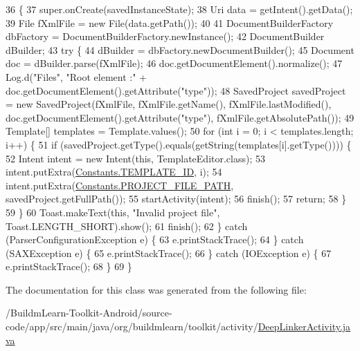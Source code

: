 \begin{DoxyCode}
36                                                        \{
37         super.onCreate(savedInstanceState);
38         Uri data = getIntent().getData();
39         File fXmlFile = \textcolor{keyword}{new} File(data.getPath());
40 
41         DocumentBuilderFactory dbFactory = DocumentBuilderFactory.newInstance();
42         DocumentBuilder dBuilder;
43         \textcolor{keywordflow}{try} \{
44             dBuilder = dbFactory.newDocumentBuilder();
45             Document doc = dBuilder.parse(fXmlFile);
46             doc.getDocumentElement().normalize();
47             Log.d(\textcolor{stringliteral}{"Files"}, \textcolor{stringliteral}{"Root element :"} + doc.getDocumentElement().getAttribute(\textcolor{stringliteral}{"type"}));
48             SavedProject savedProject = \textcolor{keyword}{new} SavedProject(fXmlFile, fXmlFile.getName(), 
      fXmlFile.lastModified(), doc.getDocumentElement().getAttribute(\textcolor{stringliteral}{"type"}), fXmlFile.getAbsolutePath());
49             Template[] templates = Template.values();
50             \textcolor{keywordflow}{for} (\textcolor{keywordtype}{int} i = 0; i < templates.length; i++) \{
51                 \textcolor{keywordflow}{if} (savedProject.getType().equals(getString(templates[i].getType()))) \{
52                     Intent intent = \textcolor{keyword}{new} Intent(\textcolor{keyword}{this}, TemplateEditor.class);
53                     intent.putExtra(\hyperlink{classorg_1_1buildmlearn_1_1toolkit_1_1constant_1_1Constants_a2ee9d59d6a353dc4664ed2e2086dae9d}{Constants.TEMPLATE\_ID}, i);
54                     intent.putExtra(\hyperlink{classorg_1_1buildmlearn_1_1toolkit_1_1constant_1_1Constants_ab2586e8aa144cd7e8b4928186d709ea8}{Constants.PROJECT\_FILE\_PATH}, 
      savedProject.getFullPath());
55                     startActivity(intent);
56                     finish();
57                     \textcolor{keywordflow}{return};
58                 \}
59             \}
60             Toast.makeText(\textcolor{keyword}{this}, \textcolor{stringliteral}{"Invalid project file"}, Toast.LENGTH\_SHORT).show();
61             finish();
62         \} \textcolor{keywordflow}{catch} (ParserConfigurationException e) \{
63             e.printStackTrace();
64         \} \textcolor{keywordflow}{catch} (SAXException e) \{
65             e.printStackTrace();
66         \} \textcolor{keywordflow}{catch} (IOException e) \{
67             e.printStackTrace();
68         \}
69     \}
\end{DoxyCode}


The documentation for this class was generated from the following file\-:\begin{DoxyCompactItemize}
\item 
/\-Buildm\-Learn-\/\-Toolkit-\/\-Android/source-\/code/app/src/main/java/org/buildmlearn/toolkit/activity/\hyperlink{DeepLinkerActivity_8java}{Deep\-Linker\-Activity.\-java}\end{DoxyCompactItemize}
